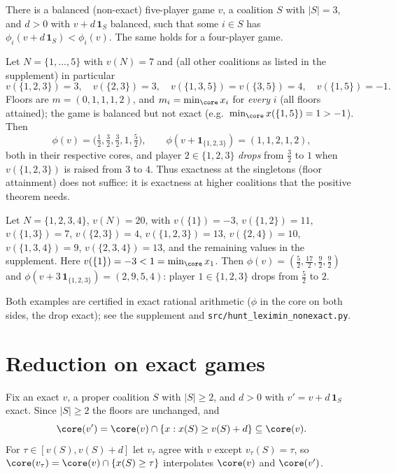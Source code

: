 \begin{theorem}\label{thm:lx-necessity}
There is a balanced (non-exact) five-player game $v$, a coalition $S$ with $|S|=3$,
and $d>0$ with $v+d\,\mathbf 1_S$ balanced, such that some $i\in S$ has
$\phi_i(v+d\,\mathbf 1_S)<\phi_i(v)$. The same holds for a four-player game.
\end{theorem}

\begin{example}[$n=5$; floors attained]\label{ex:lx-n5}
Let $N=\{1,\dots,5\}$ with $v(N)=7$ and (all other coalitions as listed in the
supplement) in particular
\[
  v(\{1,2,3\})=3,\quad v(\{2,3\})=3,\quad v(\{1,3,5\})=v(\{3,5\})=4,\quad
  v(\{1,5\})=-1 .
\]
Floors are $m=(0,1,1,1,2)$, and $m_i=\min_{\core}x_i$ for \emph{every} $i$ (all
floors attained); the game is balanced but not exact (e.g.\
$\min_{\core}x(\{1,5\})=1>-1$). Then
\[
  \phi(v)=\bigl(\tfrac12,\tfrac32,\tfrac32,1,\tfrac52\bigr),\qquad
  \phi(v+\mathbf 1_{\{1,2,3\}})=(1,1,2,1,2),
\]
both in their respective cores, and player $2\in\{1,2,3\}$ \emph{drops} from
$\tfrac32$ to $1$ when $v(\{1,2,3\})$ is raised from $3$ to $4$. Thus exactness at
the singletons (floor attainment) does not suffice: it is exactness at higher
coalitions that the positive theorem needs.
\end{example}

\begin{example}[$n=4$; floor unattained]\label{ex:lx-n4}
Let $N=\{1,2,3,4\}$, $v(N)=20$, with $v(\{1\})=-3$, $v(\{1,2\})=11$,
$v(\{1,3\})=7$, $v(\{2,3\})=4$, $v(\{1,2,3\})=13$, $v(\{2,4\})=10$,
$v(\{1,3,4\})=9$, $v(\{2,3,4\})=13$, and the remaining values in the supplement.
Here $v(\{1\})=-3<1=\min_{\core}x_1$. Then $\phi(v)=(\tfrac52,\tfrac{17}2,
\tfrac92,\tfrac92)$ and $\phi(v+3\,\mathbf 1_{\{1,2,3\}})=(2,9,5,4)$: player
$1\in\{1,2,3\}$ drops from $\tfrac52$ to $2$.
\end{example}

Both examples are certified in exact rational arithmetic ($\phi$ in the core on
both sides, the drop exact); see the supplement and \texttt{src/hunt\_leximin\_nonexact.py}.


\section{Reduction on exact games}\label{sec:lx-reduction}

Fix an exact $v$, a proper coalition $S$ with $|S|\ge 2$, and $d>0$ with
$v'=v+d\,\mathbf 1_S$ exact. Since $|S|\ge2$ the floors are unchanged, and
\[
  \core(v')=\core(v)\cap\{x:x(S)\ge v(S)+d\}\subseteq\core(v).
\]
For $\tau\in[v(S),v(S)+d]$ let $v_\tau$ agree with $v$ except $v_\tau(S)=\tau$, so
$\core(v_\tau)=\core(v)\cap\{x(S)\ge\tau\}$ interpolates $\core(v)$ and $\core(v')$.

